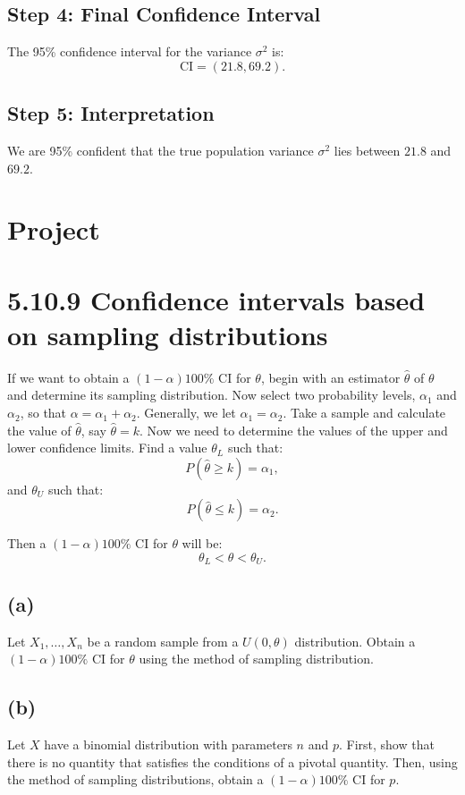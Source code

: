 \documentclass{article}
\begin{document}
\subsection*{Step 4: Final Confidence Interval}
The 95\% confidence interval for the variance \(\sigma^2\) is:
\[
\text{CI} = (21.8, 69.2).
\]

\subsection*{Step 5: Interpretation}
We are 95\% confident that the true population variance \(\sigma^2\) lies between \(21.8\) and \(69.2\).


\section*{Project}

\section*{5.10.9 Confidence intervals based on sampling distributions}

If we want to obtain a \((1 - \alpha)100\%\) CI for \(\theta\), begin with an estimator \(\hat{\theta}\) of \(\theta\) and determine its sampling distribution. Now select two probability levels, \(\alpha_1\) and \(\alpha_2\), so that \(\alpha = \alpha_1 + \alpha_2\). Generally, we let \(\alpha_1 = \alpha_2\). Take a sample and calculate the value of \(\hat{\theta}\), say \(\hat{\theta} = k\). Now we need to determine the values of the upper and lower confidence limits. Find a value \(\theta_L\) such that:
\[
P(\hat{\theta} \geq k) = \alpha_1,
\]
and \(\theta_U\) such that:
\[
P(\hat{\theta} \leq k) = \alpha_2.
\]

Then a \((1 - \alpha)100\%\) CI for \(\theta\) will be:
\[
\theta_L < \theta < \theta_U.
\]

\subsection*{(a)}
Let \(X_1, \ldots, X_n\) be a random sample from a \(U(0, \theta)\) distribution. Obtain a \((1 - \alpha)100\%\) CI for \(\theta\) using the method of sampling distribution.

\subsection*{(b)}
Let \(X\) have a binomial distribution with parameters \(n\) and \(p\). First, show that there is no quantity that satisfies the conditions of a pivotal quantity. Then, using the method of sampling distributions, obtain a \((1 - \alpha)100\%\) CI for \(p\).
\end{document}
